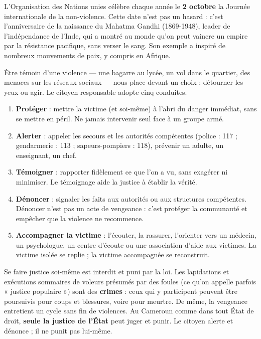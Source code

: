 \documentclass[11pt]{article}
\newcommand{\cle}[1]{{\popxbold\color{popdark}#1}}
\newcounter{popsec}
\newcounter{popsub}
\newcommand{\courssub}[1]{%
  \stepcounter{popsub}%
  \par\vspace{9pt}\noindent{\popxbold\fontsize{11.5}{13}\selectfont\color{popink}{\color{poporange}\thepopsec.\thepopsub}\hspace{6pt}#1}\par\nopagebreak\vspace{4pt}
}
\begin{document}
\begin{savaistu}
L'Organisation des Nations unies célèbre chaque année le \textbf{2 octobre} la Journée internationale de la non-violence. Cette date n'est pas un hasard : c'est l'anniversaire de la naissance du \cle{Mahatma Gandhi} (1869-1948), leader de l'indépendance de l'Inde, qui a montré au monde qu'on peut vaincre un empire par la résistance pacifique, sans verser le sang. Son exemple a inspiré de nombreux mouvements de paix, y compris en Afrique.
\end{savaistu}

\courssub{Les conduites à tenir face à une violence}

Être témoin d'une violence — une bagarre au lycée, un vol dans le quartier, des menaces sur les réseaux sociaux — nous place devant un choix : détourner les yeux ou agir. Le citoyen responsable adopte cinq conduites.

\begin{methode}
\begin{enumerate}
\item \textbf{Protéger} : mettre la victime (et soi-même) à l'abri du danger immédiat, sans se mettre en péril. Ne jamais intervenir seul face à un groupe armé.
\item \textbf{Alerter} : appeler les secours et les autorités compétentes (police : 117 ; gendarmerie : 113 ; sapeurs-pompiers : 118), prévenir un adulte, un enseignant, un chef.
\item \textbf{Témoigner} : rapporter fidèlement ce que l'on a vu, sans exagérer ni minimiser. Le témoignage aide la justice à établir la vérité.
\item \textbf{Dénoncer} : signaler les faits aux autorités ou aux structures compétentes. Dénoncer n'est pas un acte de vengeance : c'est protéger la communauté et empêcher que la violence ne recommence.
\item \textbf{Accompagner la victime} : l'écouter, la rassurer, l'orienter vers un médecin, un psychologue, un centre d'écoute ou une association d'aide aux victimes. La victime isolée se replie ; la victime accompagnée se reconstruit.
\end{enumerate}
\end{methode}

\begin{attention}
Se faire justice soi-même est interdit et puni par la loi. Les \cle{lapidations} et exécutions sommaires de voleurs présumés par des foules (ce qu'on appelle parfois « justice populaire ») sont des \textbf{crimes} : ceux qui y participent peuvent être poursuivis pour coups et blessures, voire pour meurtre. De même, la vengeance entretient un cycle sans fin de violences. Au Cameroun comme dans tout État de droit, \textbf{seule la justice de l'État} peut juger et punir. Le citoyen alerte et dénonce ; il ne punit pas lui-même.
\end{attention}
\end{document}

